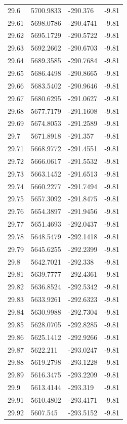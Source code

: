 \begin{table}[H]
\begin{tabular}{llll}
29.6 & 5700.9833 & -290.376 & -9.81 \\
29.61 & 5698.0786 & -290.4741 & -9.81 \\
29.62 & 5695.1729 & -290.5722 & -9.81 \\
29.63 & 5692.2662 & -290.6703 & -9.81 \\
29.64 & 5689.3585 & -290.7684 & -9.81 \\
29.65 & 5686.4498 & -290.8665 & -9.81 \\
29.66 & 5683.5402 & -290.9646 & -9.81 \\
29.67 & 5680.6295 & -291.0627 & -9.81 \\
29.68 & 5677.7179 & -291.1608 & -9.81 \\
29.69 & 5674.8053 & -291.2589 & -9.81 \\
29.7 & 5671.8918 & -291.357 & -9.81 \\
29.71 & 5668.9772 & -291.4551 & -9.81 \\
29.72 & 5666.0617 & -291.5532 & -9.81 \\
29.73 & 5663.1452 & -291.6513 & -9.81 \\
29.74 & 5660.2277 & -291.7494 & -9.81 \\
29.75 & 5657.3092 & -291.8475 & -9.81 \\
29.76 & 5654.3897 & -291.9456 & -9.81 \\
29.77 & 5651.4693 & -292.0437 & -9.81 \\
29.78 & 5648.5479 & -292.1418 & -9.81 \\
29.79 & 5645.6255 & -292.2399 & -9.81 \\
29.8 & 5642.7021 & -292.338 & -9.81 \\
29.81 & 5639.7777 & -292.4361 & -9.81 \\
29.82 & 5636.8524 & -292.5342 & -9.81 \\
29.83 & 5633.9261 & -292.6323 & -9.81 \\
29.84 & 5630.9988 & -292.7304 & -9.81 \\
29.85 & 5628.0705 & -292.8285 & -9.81 \\
29.86 & 5625.1412 & -292.9266 & -9.81 \\
29.87 & 5622.211 & -293.0247 & -9.81 \\
29.88 & 5619.2798 & -293.1228 & -9.81 \\
29.89 & 5616.3475 & -293.2209 & -9.81 \\
29.9 & 5613.4144 & -293.319 & -9.81 \\
29.91 & 5610.4802 & -293.4171 & -9.81 \\
29.92 & 5607.545 & -293.5152 & -9.81 \\

\end{tabular}
\end{table}
